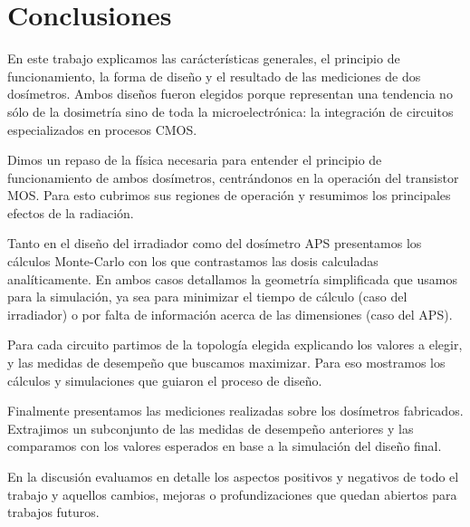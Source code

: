 \section{Conclusiones}
En este trabajo explicamos las carácterísticas generales, 
el principio de funcionamiento, 
la forma de diseño y el resultado de las mediciones de dos dosímetros.
Ambos diseños fueron elegidos porque representan una tendencia no sólo de
la dosimetría sino de toda la microelectrónica:
la integración de circuitos especializados en procesos CMOS.

Dimos un repaso de la física necesaria para entender el principio de
funcionamiento de ambos dosímetros, centrándonos en la operación del transistor
MOS. Para esto cubrimos sus regiones de operación y resumimos los principales
efectos de la radiación.

Tanto en el diseño del irradiador como del dosímetro APS presentamos los
cálculos Monte-Carlo con los que contrastamos las dosis calculadas
analíticamente. En ambos casos detallamos la geometría simplificada que usamos
para la simulación, ya sea para minimizar el tiempo de cálculo (caso del
irradiador) o por falta de información acerca de las dimensiones (caso del
APS).

Para cada circuito partimos de la topología elegida explicando los valores a
elegir, y las medidas de desempeño que buscamos maximizar. Para eso mostramos
los cálculos y simulaciones que guiaron el proceso de diseño.

Finalmente presentamos las mediciones realizadas sobre los dosímetros
fabricados. Extrajimos un subconjunto de las medidas de desempeño anteriores y
las comparamos con los valores esperados en base a la simulación del diseño
final.

En la discusión evaluamos en detalle los aspectos positivos y negativos de todo
el trabajo y aquellos cambios, mejoras o profundizaciones que quedan abiertos
para trabajos futuros.
